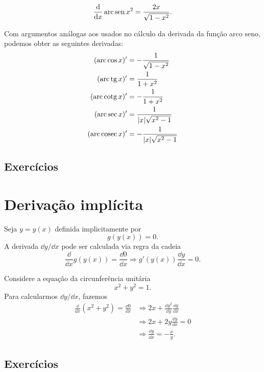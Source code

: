 \begin{ex}
  \begin{equation}
    \frac{\mathrm{d}}{\mathrm{d} x}\operatorname{arc}\operatorname{sen} x^2 = \frac{2x}{\sqrt{1-x^2}}.
  \end{equation}
\end{ex}

Com argumentos análogas aos usados no cálculo da derivada da função arco seno, podemos obter as seguintes derivadas:
\begin{align}
  (\operatorname{arc}\cos x)' &= -\frac{1}{\sqrt{1-x^2}}\\
  (\operatorname{arc}\operatorname{tg} x)' &= \frac{1}{1+x^2}\\
  (\operatorname{arc}\operatorname{cotg} x)' &= -\frac{1}{1+x^2}\\
  (\operatorname{arc}\sec x)' &= \frac{1}{|x|\sqrt{x^2-1}}\\
  (\operatorname{arc}\operatorname{cosec} x)' &= -\frac{1}{|x|\sqrt{x^2-1}}
\end{align}

\subsection*{Exercícios}

\emconstrucao

\section{Derivação implícita}\label{cap_deriv_sec_derimp}

Seja $y = y(x)$ definida implicitamente por
\begin{equation}
  g(y(x)) = 0.
\end{equation}
A derivada $\dd y/\dd x$ pode ser calculada via regra da cadeia
\begin{equation}
  \frac{\dd}{\dd x}g(y(x)) = \frac{\dd 0}{\dd x} \Rightarrow g'(y(x))\frac{\dd y}{\dd x} = 0.
\end{equation}

\begin{ex}
  Considere a equação da circunferência unitária
  \begin{equation}
    x^2 + y^2 = 1.
  \end{equation}
  Para calcularmos $\dd y/\dd x$, fazemos
  \begin{align}
    \frac{\dd}{\dd x}\left(x^2+y^2\right) = \frac{\dd 0}{\dd x} &\Rightarrow 2x + \frac{\dd y^2}{\dd y}\frac{\dd y}{\dd x}\\
                                                                &\Rightarrow 2x + 2y\frac{\dd y}{\dd x} = 0\\
                                                                &\Rightarrow \frac{\dd y}{\dd x} = -\frac{x}{y}.
  \end{align}
\end{ex}

\emconstrucao

\subsection*{Exercícios}

